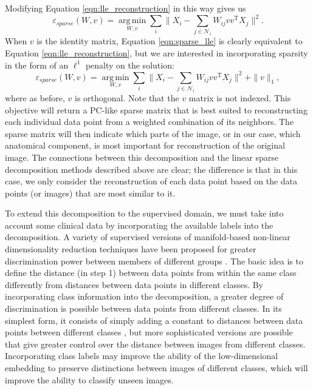 \documentclass[11pt]{nih}
\begin{document}
Modifying Equation \ref{eqn:lle_reconstruction} in this way gives us 
\begin{equation}
\varepsilon_{sparse} \left(W, v\right) = \underset{W, v}{\operatorname{arg\, min}} \sum_i \| X_i - \sum_{j \in \mathcal{N}_i}W_{ij} v v^{\mathrm{T}} X_j \|^2.
\label{eqn:sparse_lle}
\end{equation}
When $v$ is the identity matrix, Equation \ref{eqn:sparse_lle} is clearly equivalent to Equation \ref{eqn:lle_reconstruction}, but we are interested in incorporating sparsity in the form of an $\ell^1$ penalty on the solution: 
\begin{equation}
\varepsilon_{sparse} \left(W, v\right) = \underset{W,v}{\operatorname{arg\, min}}\sum_i \| X_i - \sum_{j \in \mathcal{N}_i}W_{ij} v v^{\mathrm{T}} X_j \|^2 + \|v\|_1,
\end{equation}
where as before, $v$ is orthogonal.  Note that the $v$ matrix is not indexed.  This objective will return a PC-like sparse matrix that is best suited to reconstructing each individual data point from a weighted combination of its neighbors.  The sparse matrix will then indicate which parts of the image, or in our case, which anatomical component, is most important for reconstruction of the original image.  The connections between this decomposition and the linear sparse decomposition methods described above are clear; the difference is that in this case, we only consider the reconstruction of each data point based on the data points (or images) that are most similar to it.  

To extend this decomposition to the supervised domain, we must take into account some clinical data by incorporating the available labels into the decomposition.  A variety of supervised versions of manifold-based non-linear dimensionality reduction techniques have been proposed for greater discrimination power between members of different groups \cite{kaynak_supervised_????,yang_extended_2002,geng_supervised_2005,raducanu_supervised_2012} .  The basic idea is to define the distance (in step 1) between data points from within the same class differently from distances between data points in different classes.  By incorporating class information into the decomposition, a greater degree of discrimination is possible between data points from different classes.  In its simplest form, it consists of simply adding a constant to distances between data points between different classes \cite{kaynak_supervised_????}, but more sophisticated versions are possible that give greater control over the distance between images from different classes. Incorporating class labels may improve the ability of the low-dimensional embedding to preserve distinctions between images of different classes, which will improve the ability to classify unseen images.  
\end{document}
